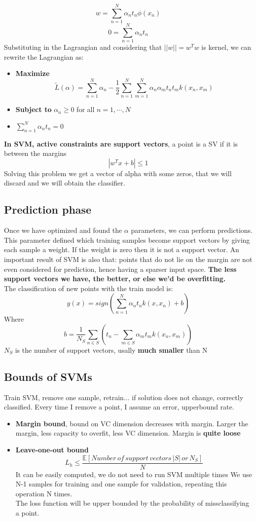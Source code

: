     $$w=\sum_{n=1}^N\alpha_nt_n\phi(x_n)$$
    $$0=\sum_{n=1}^N\alpha_nt_n$$
    Substituting in the Lagrangian and considering that $||w||=w^Tw$ is kernel, we can rewrite the Lagrangian as:
    \begin{itemize}
        \item \textbf{Maximize} $$\tilde{L}(\alpha)=\sum_{n=1}^N\alpha_n-\frac{1}{2}\sum_{n=1}^N\sum_{m=1}^N\alpha_n\alpha_mt_nt_mk(x_n,x_m)$$
        \item \textbf{Subject to} $\alpha_n \geq 0$ for all $n=1,\cdots,N$
        \item $\sum_{n=1}^N\alpha_nt_n=0$
    \end{itemize}
    \textbf{In SVM, active constraints are support vectors}, a point is a SV if it is between the margins
    $$|w^Tx+b|\leq 1$$
    Solving this problem we get a vector of alpha with some zeros, that we will discard and we will obtain the classifier.

\subsection{Prediction phase}
    Once we have optimized and found the $\alpha$ parameters, we can perform predictions. This parameter defined which training samples become support vectors by giving each sample a weight. If the weight is zero then it is not a support vector. An important result of SVM is also that: points that do not lie on the margin are not even considered for prediction, hence having a sparser input space. \textbf{The less support vectors we have, the better, or else we'd be overfitting.}\\
    The classification of new points with the train model is:
    $$y(x)=sign\left(\sum_{n=1}^N\alpha_nt_nk(x,x_n)+b\right)$$
    Where
    $$b=\frac{1}{N_S}\sum_{n\in S}\left(t_n-\sum_{m\in S}\alpha_mt_mk(x_n,x_m)\right)$$
    $N_S$ is the number of support vectors, usally \textbf{much smaller} than N

\subsection{Bounds of SVMs}
    Train SVM, remove one sample, retrain... if solution does not change, correctly classified. Every time I remove a point, I assume an error, upperbound rate.
    \begin{itemize}
        \item \textbf{Margin bound}, bound on VC dimension decreases with margin. Larger the margin, less capacity to overfit, less VC dimension. Margin is \textbf{quite loose}
        \item \textbf{Leave-one-out bound}
        $$L_h\leq\frac{\mathbb{E}[Number\,of\,support\,vectors\,|S|\,or\,N_S]}{N}$$
        It can be easily computed, we do not need to run SVM multiple times
        We use N-1 samples for training and one sample for validation, repeating this operation N times.\\
        The loss function will be upper bounded by the probability of missclassifying a point.
    \end{itemize}

